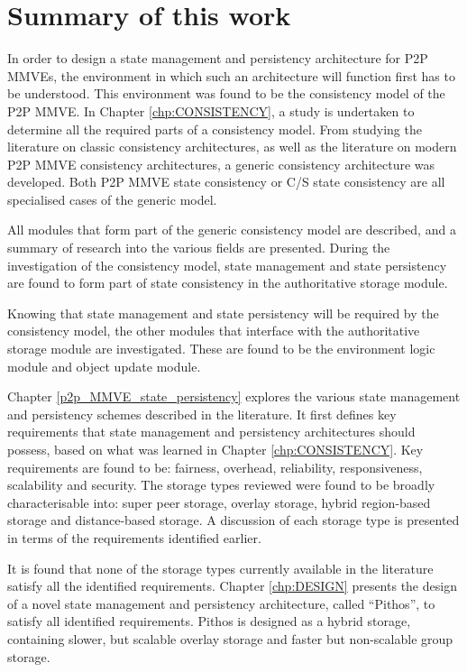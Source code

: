 \section{Summary of this work}

In order to design a state management and persistency architecture for P2P MMVEs, the environment in which such an architecture will function first has to be understood. This environment was found to be the consistency model of the P2P MMVE. In Chapter \ref{chp:CONSISTENCY}, a study is undertaken to determine all the required parts of a consistency model. From studying the literature on classic consistency architectures, as well as the literature on modern P2P MMVE consistency architectures, a generic consistency architecture was developed. Both P2P MMVE state consistency or C/S state consistency are all specialised cases of the generic model.

All modules that form part of the generic consistency model are described, and a summary of research into the various fields are presented. During the investigation of the consistency model, state management and state persistency are found to form part of state consistency in the authoritative storage module.

Knowing that state management and state persistency will be required by the consistency model, the other modules that interface with the authoritative storage module are investigated. These are found to be the environment logic module and object update module.

Chapter \ref{p2p_MMVE_state_persistency} explores the various state management and persistency schemes described in the literature. It first defines key requirements that state management and persistency architectures should possess, based on what was learned in Chapter \ref{chp:CONSISTENCY}. Key requirements are found to be: fairness, overhead, reliability, responsiveness, scalability and security. The storage types reviewed were found to be broadly characterisable into: super peer storage, overlay storage, hybrid region-based storage and distance-based storage. A discussion of each storage type is presented in terms of the requirements identified earlier.

It is found that none of the storage types currently available in the literature satisfy all the identified requirements. Chapter \ref{chp:DESIGN} presents the design of a novel state management and persistency architecture, called ``Pithos'', to satisfy all identified requirements. Pithos is designed as a hybrid storage, containing slower, but scalable overlay storage and faster but non-scalable group storage.

